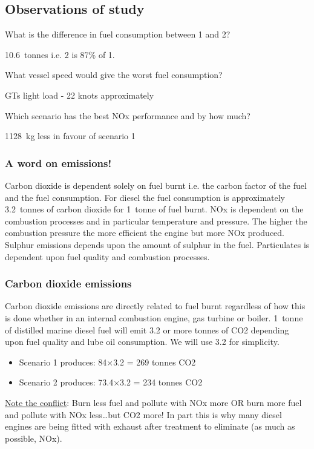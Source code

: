 \subsection{Observations of study}
What is the difference in fuel consumption between 1 and 2?
\begin{quoting}
    \SI{10.6}{tonnes} i.e. 2 is 87\% of 1.
\end{quoting}
What vessel speed would give the worst fuel consumption?
\begin{quoting}
    GTs light load - 22 knots approximately
\end{quoting}
Which scenario has the best NOx performance and by how much?
\begin{quoting}
    \SI{1128}{\kilo\gram} less in favour of scenario 1
\end{quoting}
\subsubsection{A word on emissions!}
Carbon dioxide is dependent solely on fuel burnt i.e. the carbon factor of the fuel and the fuel consumption. For diesel the fuel consumption is approximately \SI{3.2}{tonnes} of carbon dioxide for \SI{1}{tonne} of fuel burnt. NOx is dependent on the combustion processes and in particular temperature and pressure. The higher the combustion pressure the more efficient the engine but more NOx produced. Sulphur emissions depends upon the amount of sulphur in the fuel. Particulates is dependent upon fuel quality and combustion processes.
\subsubsection{Carbon dioxide emissions}
Carbon dioxide emissions are directly related to fuel burnt regardless of how this is done whether in an internal combustion engine, gas turbine or boiler. \SI{1}{tonne} of distilled marine diesel fuel will emit 3.2 or more tonnes of CO2 depending upon fuel quality and lube oil consumption. We will use 3.2 for simplicity.
\begin{itemize}
    \item Scenario 1 produces: 84$\times$3.2 = 269 tonnes CO2
    \item Scenario 2 produces: 73.4$\times$3.2 = 234 tonnes CO2
\end{itemize}
\underline{Note the conflict}:
Burn less fuel and pollute with NOx more OR burn more fuel and pollute with NOx less\dots but CO2 more! In part this is why many diesel engines are being fitted with exhaust after treatment to eliminate (as much as possible, NOx).
